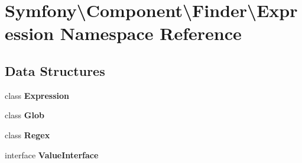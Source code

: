 \section{Symfony\textbackslash{}Component\textbackslash{}Finder\textbackslash{}Expression Namespace Reference}
\label{namespace_symfony_1_1_component_1_1_finder_1_1_expression}
\subsection*{Data Structures}
\begin{DoxyCompactItemize}
\item 
class {\bf Expression}
\item 
class {\bf Glob}
\item 
class {\bf Regex}
\item 
interface {\bf Value\+Interface}
\end{DoxyCompactItemize}
